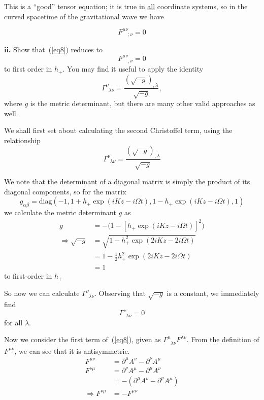\documentclass[a4paper]{article} %
\newcommand{\ph}[1]{\phantom{#1}}
\newcommand{\diag}{\text{diag}}
\begin{document}
This is a ``good'' tensor equation; it is true in \underline{all} coordinate systems, so in the curved spacetime of the gravitational wave we have

\begin{equation}
F^{\mu\nu}_{\ph{\mu\nu};\nu}=0
\end{equation}


\begin{framed}
\textbf{ii.} Show that~(\ref{eq8}) reduces to
\begin{equation}
F^{\mu\nu}_{\ph{\mu\nu},\nu}=0 \label{eq9}
\end{equation}
to first order in $h_+$. You may find it useful to apply the identity
\begin{equation}
\Gamma^{\nu}_{\ph{\nu}\lambda\nu}=\frac{(\sqrt{-g})_{,\lambda}}{\sqrt{-g}},
\end{equation}
where $g$ is the metric determinant, but there are many other valid approaches as well.
\end{framed}

We shall first set about calculating the second Christoffel term, using the relationship
\begin{equation}
\Gamma^{\nu}_{\ph{\nu}\lambda\nu}=\frac{(\sqrt{-g})_{,\lambda}}{\sqrt{-g}}
\end{equation}

We note that the determinant of a diagonal matrix is simply the product of its diagonal components, so for the matrix
\begin{equation}
g_{\alpha\beta}=\diag(-1,1+h_+\exp(iKz-i\Omega t),1-h_+\exp(iKz-i\Omega t),1)
\end{equation}
we calculate the metric determinant $g$ as
\begin{align}
g&=-\big(1-\left[h_+\exp(iKz-i\Omega t)\right]^2\big)\\
\Rightarrow \sqrt{-g}&=\sqrt{1-h_+^2\exp(2iKz-2i\Omega t)}\\
&= 1-\frac{1}{2}h_+^2 \exp(2iKz - 2i\Omega t)\\
&=1
\end{align}
to first-order in $h_+$

So now we can calculate $\Gamma^{\nu}_{\ph{\nu}\lambda\nu}$. Observing that $\sqrt{-g}$ is a constant, we immediately find
\begin{equation}
\Gamma^{\nu}_{\ph{\nu}\lambda\nu}=0\label{sqrt g}
\end{equation}
for all $\lambda$.

Now we consider the first term of~(\ref{eq8}), given as $\Gamma^{\mu}_{\ph{\mu}\lambda\nu} F^{\lambda\nu}$. From the definition of $F^{\mu\nu}$, we can see that it is antisymmetric.
\begin{align}
F^{\mu\nu}&=\partial^{\mu}A^{\nu}-\partial^{\nu}A^{\mu}\\
F^{\nu\mu}&=\partial^{\nu}A^{\mu}-\partial^{\mu}A^{\nu}\\
&=-\left(\partial^{\mu}A^{\nu}-\partial^{\nu}A^{\mu}\right)\\
\Rightarrow F^{\nu\mu}&=-F^{\mu\nu}
\end{align}
\end{document}
